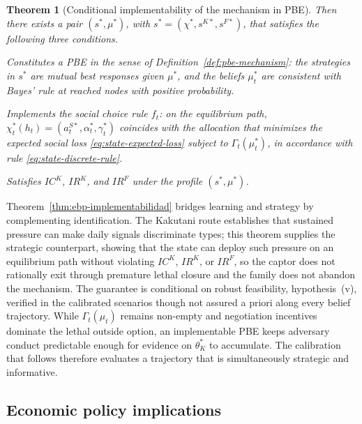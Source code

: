 \documentclass[review,authoryear,12pt]{elsarticle}
\theoremstyle{plain}
\newtheorem{theorem}{Theorem}
\theoremstyle{definition}
\newcommand{\1}{\mathbf{1}}
\begin{document}
\begin{theorem}[Conditional implementability of the mechanism in PBE]
Then there exists a pair $(s^\ast,\mu^\ast)$, with $s^\ast=({\chi}^\ast,s^{K\ast},s^{F\ast})$, that satisfies the following three conditions.
\begin{list}{}{\setlength{\labelwidth}{2.0em}\setlength{\labelsep}{0.7em}\setlength{\leftmargin}{2.7em}\setlength{\itemindent}{0pt}\setlength{\listparindent}{0pt}\setlength{\parsep}{0pt}\setlength{\itemsep}{0.25\baselineskip}}
    \item[\textup{(a)}] Constitutes a PBE in the sense of Definition~\ref{def:pbe-mechanism}: the strategies in $s^\ast$ are mutual best responses given $\mu^\ast$, and the beliefs $\mu_t^\ast$ are consistent with Bayes' rule at reached nodes with positive probability.
    \item[\textup{(b)}] Implements the social choice rule $f_t$: on the equilibrium path, $\chi_t^\ast(h_t)=(a_t^{S\ast},\alpha_t^\ast,\gamma_t^\ast)$ coincides with the allocation that minimizes the expected social loss \eqref{eq:state-expected-loss} subject to $\Gamma_t(\mu_t^\ast)$, in accordance with rule \eqref{eq:state-discrete-rule}.
    \item[\textup{(c)}] Satisfies $IC^K$, $IR^K$, and $IR^F$ under the profile $(s^\ast,\mu^\ast)$.
\end{list}
\end{theorem}

\noindent Theorem~\ref{thm:ebp-implementabilidad} bridges learning and strategy by complementing identification. The Kakutani route establishes that sustained pressure can make daily signals discriminate types; this theorem supplies the strategic counterpart, showing that the state can deploy such pressure on an equilibrium path without violating $IC^K$, $IR^K$, or $IR^F$, so the captor does not rationally exit through premature lethal closure and the family does not abandon the mechanism. The guarantee is conditional on robust feasibility, hypothesis~(v), verified in the calibrated scenarios though not assured a priori along every belief trajectory. While $\Gamma_t(\mu_t)$ remains non-empty and negotiation incentives dominate the lethal outside option, an implementable PBE keeps adversary conduct predictable enough for evidence on $\theta_K^\ast$ to accumulate. The calibration that follows therefore evaluates a trajectory that is simultaneously strategic and informative.

\subsection{Economic policy implications}\label{subsec:implicaciones-politica}
\end{document}
